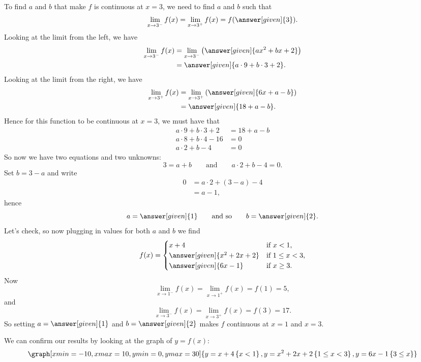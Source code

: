 \documentclass{ximera}
\begin{document}
\begin{example}
\begin{explanation}
To find $a$ and $b$ that make $f$ is continuous at $x=3$, we need to
find $a$ and $b$ such that
\[
\lim_{x\to 3^-} f(x) =\lim_{x\to 3^+}f(x) =f(\answer[given]{3}).
\]
Looking at the limit from the left, we have
\begin{align*}
  \lim_{x\to 3^-} f(x) &= \lim_{x\to 3^-} \left(\answer[given]{ax^2+bx+2}\right) \\
  &=\answer[given]{a\cdot 9 + b\cdot 3 + 2}.
\end{align*}
Looking at the limit from the right, we have
\begin{align*}
  \lim_{x\to 3^+} f(x) &= \lim_{x\to 3^+} \left(\answer[given]{6x+a-b}\right) \\
  &= \answer[given]{18+a-b}.
\end{align*}
Hence for this function to be continuous at $x=3$, we must have that
\begin{align*}
  a\cdot 9 + b\cdot 3 + 2 &= 18+a-b\\
  a\cdot 8 + b\cdot 4 -16 &= 0\\
  a\cdot 2 + b -4 &= 0
\end{align*}
So now we have two equations and two unknowns:
\[
 3=a+b \qquad\text{and}\qquad a\cdot 2 + b -4 = 0.
 \]
 Set $b = 3-a$ and write
 \begin{align*}
   0&= a\cdot 2 + (3-a) -4 \\
   &= a -1,
 \end{align*}
 hence
 \[
 a=\answer[given]{1}\qquad\text{and so}\qquad b =\answer[given]{2}.
 \]
 Let's check, so now plugging in values for both $a$ and $b$ we find
 \[
 f(x) = 
 \begin{cases}
   x+4 &\text{if $x<1$,}\\
   \answer[given]{x^2+2x+2} &\text{if $1\le x< 3$,}\\
   \answer[given]{6x-1} &\text{if $x\ge 3$.}
\end{cases}
 \]
 Now
 \[
 \lim_{x\to 1^-} f(x) =\lim_{x\to 1^+}f(x) =f(1) =  5,
 \]
 and
 \[
 \lim_{x\to 3^-} f(x) =\lim_{x\to 3^+}f(x) =f(3) = 17.  
 \]
 So setting $a= \answer[given]{1}$ and $b=\answer[given]{2}$ makes $f$ continuous at $x=1$ and $x=3$.
 \begin{onlineOnly}
   We can confirm our results by looking at the graph of $y=f(x)$:
   \[
   \graph[xmin=-10,xmax=10,ymin=0,ymax=30]{y=x+4\left\{x<1\right\},y=x^2+2x+2\left\{1\leq x<3\right\},y=6x-1\left\{3 \leq x\right\}} 
   \]
 \end{onlineOnly}
\end{explanation}
\end{example}
\end{document}

